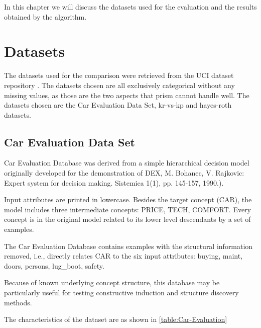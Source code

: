 In this chapter we will discuss the datasets used for the evaluation and the results obtained by the algorithm.

\section{Datasets}

The datasets used for the comparison were retrieved from the UCI dataset repository \cite{UCI}. The datasets chosen are all exclusively categorical without any missing values, as those are the two aspects that prism cannot handle well. The datasets chosen are the Car Evaluation Data Set, kr-vs-kp and hayes-roth datasets.

\subsection{Car Evaluation Data Set}

Car Evaluation Database\cite{CarDatasetUCI} was derived from a simple hierarchical decision model originally developed for the demonstration of DEX, M. Bohanec, V. Rajkovic: Expert system for decision making. Sistemica 1(1), pp. 145-157, 1990.).\;

Input attributes are printed in lowercase. Besides the target concept (CAR), the model includes three intermediate concepts: PRICE, TECH, COMFORT. Every concept is in the original model related to its lower level descendants by a set of examples.\;

The Car Evaluation Database contains examples with the structural information removed, i.e., directly relates CAR to the six input attributes: buying, maint, doors, persons, lug\_boot, safety.\;

Because of known underlying concept structure, this database may be particularly useful for testing constructive induction and structure discovery methods.\;

The characteristics of the dataset are as shown in \ref{table:Car-Evaluation}\;
\begin{table}[ht]
\caption{\label{table:Car-Evaluation}Car Evaluation Characteristics}
\end{table}

